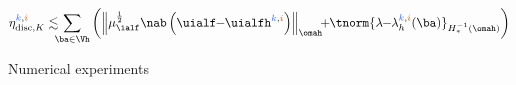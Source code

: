 \documentclass[aspectratio=169]{beamer}
\newcommand{\kk}{\textcolor{royalblue}{k}}
\newcommand{\ii}{\textcolor{burntorange}{i}}
\begin{document}
\begin{frame}
{{{\begin{minipage}[c]{0.65 \textwidth}
\begin{equation*}
\eta_{\mathrm{disc},K}^{\kk,\ii}  \lesssim \hspace{-0.1 cm}  \hspace{-0.1 cm} \sum_{\ba \in \Vh} \left(\left\|\mu_{\ialf}^{\frac{1}{2}} \nab \left(\uialf \hspace{-0.1 cm} - \hspace{-0.1 cm} \uialfh^{\kk,\ii} \right)  \right\|_{\omah} \hspace{-0.15 cm} + \hspace{-0.1 cm} \tnorm{\lambda \hspace{-0.1 cm} - \hspace{-0.1 cm} \lambda_h^{\kk,\ii}(\ba)}_{H^{-1}_{*}(\omah)}\right)
\end{equation*}
\end{minipage}
 }}}
\end{frame}
%
\begin{frame}
\centering
\Huge{\textcolor{carmine}{Numerical experiments}}
\end{frame}
%
\end{document}
